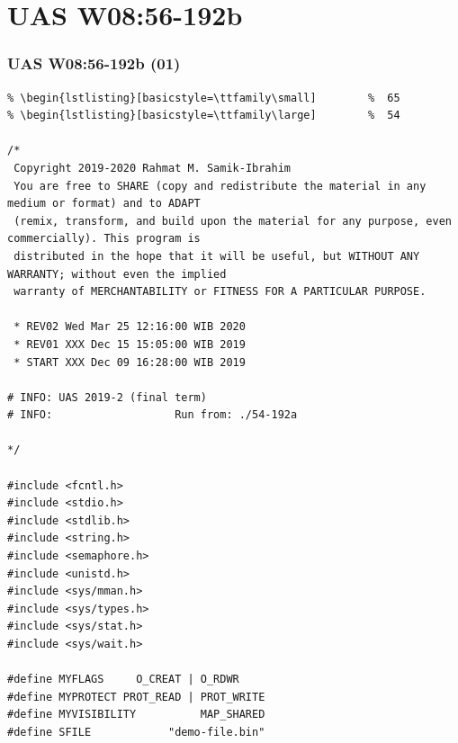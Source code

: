 \documentclass[xcolor=table, notheorems, hyperref={pdfpagelabels=false}]{beamer}
\begin{document}
\section{UAS W08:56-192b}
\begin{frame}[fragile]
\frametitle{UAS W08:56-192b (01)}
\begin{lstlisting}[basicstyle=\ttfamily\tiny]         % 108
% \begin{lstlisting}[basicstyle=\ttfamily\footnotesize] %  72
% \begin{lstlisting}[basicstyle=\ttfamily\small]        %  65
% \begin{lstlisting}[basicstyle=\ttfamily\large]        %  54

/*
 Copyright 2019-2020 Rahmat M. Samik-Ibrahim
 You are free to SHARE (copy and redistribute the material in any medium or format) and to ADAPT
 (remix, transform, and build upon the material for any purpose, even commercially). This program is
 distributed in the hope that it will be useful, but WITHOUT ANY WARRANTY; without even the implied 
 warranty of MERCHANTABILITY or FITNESS FOR A PARTICULAR PURPOSE.

 * REV02 Wed Mar 25 12:16:00 WIB 2020
 * REV01 XXX Dec 15 15:05:00 WIB 2019
 * START XXX Dec 09 16:28:00 WIB 2019

# INFO: UAS 2019-2 (final term)
# INFO:                   Run from: ./54-192a

*/

#include <fcntl.h>
#include <stdio.h>
#include <stdlib.h>
#include <string.h>
#include <semaphore.h>
#include <unistd.h>
#include <sys/mman.h>
#include <sys/types.h>
#include <sys/stat.h>
#include <sys/wait.h>

#define MYFLAGS     O_CREAT | O_RDWR
#define MYPROTECT PROT_READ | PROT_WRITE
#define MYVISIBILITY          MAP_SHARED
#define SFILE            "demo-file.bin"

\end{lstlisting}
\end{frame}
\end{document}
